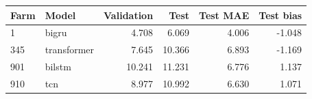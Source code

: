 \begingroup\small
\begin{longtable}{llrrrr}
\toprule
Farm & Model & Validation & Test & Test MAE & Test bias\\
\midrule\endhead
1 & bigru & 4.708 & 6.069 & 4.006 & -1.048\\
345 & transformer & 7.645 & 10.366 & 6.893 & -1.169\\
901 & bilstm & 10.241 & 11.231 & 6.776 & 1.137\\
910 & tcn & 8.977 & 10.992 & 6.630 & 1.071\\
\bottomrule
\end{longtable}
\endgroup
